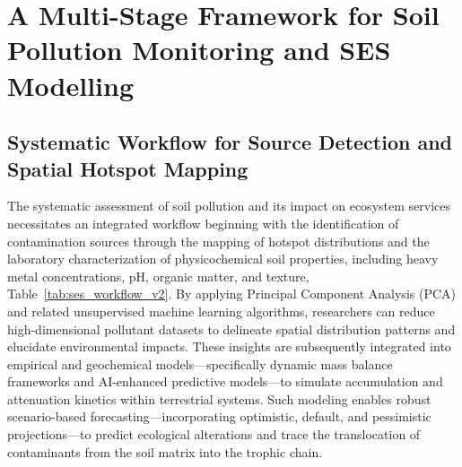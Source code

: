 \documentclass[sn-mathphys-num]{sn-jnl}
\begin{document}
\section{A Multi-Stage Framework for Soil Pollution Monitoring and SES
    Modelling}\label{sec4}

\subsection{Systematic Workflow for Source Detection and Spatial Hotspot
    Mapping}\label{sec4.1}

The systematic assessment of soil pollution and its impact on ecosystem
services necessitates an integrated workflow beginning with the identification
of contamination sources through the mapping of hotspot distributions and the
laboratory characterization of physicochemical soil properties, including
heavy metal concentrations, pH, organic matter, and texture,
Table~\ref{tab:ses_workflow_v2}. By applying Principal Component Analysis
(PCA) and related unsupervised machine learning algorithms, researchers can
reduce high-dimensional pollutant datasets to delineate spatial distribution
patterns and elucidate environmental impacts. These insights are subsequently
integrated into empirical and geochemical models---specifically dynamic mass
balance frameworks and AI-enhanced predictive models---to simulate
accumulation and attenuation kinetics within terrestrial systems. Such
modeling enables robust scenario-based forecasting---incorporating optimistic,
default, and pessimistic projections---to predict ecological alterations and
trace the translocation of contaminants from the soil matrix into the trophic
chain.
\end{document}
